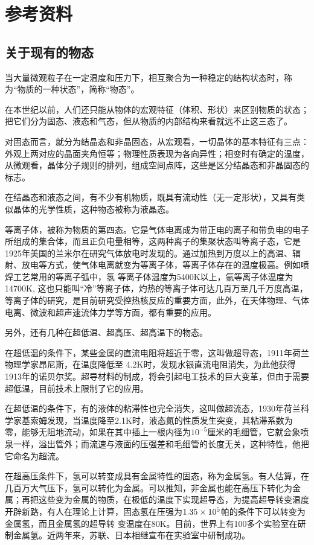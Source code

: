 \section{参考资料}
\subsection{关于现有的物态}

当大量微观粒子在一定温度和压力下，相互聚合为一种稳定的结构状态时，称为“物质的一种状态”，简称“物态”。

在本世纪以前，人们还只能从物体的宏观特征（体积、形状）来区别物质的状态；把它们分为固态、液态和气态，但从物质的内部结构来看就远不止这三态了。

对固态而言，就分为结晶态和非晶固态，从宏观看，一切晶体的基本特征有三点：外观上两对应的晶面夹角恒等；物理性质表现为各向异性；相变时有确定的温度，从微观看，晶体分子规则的排列，组成空间点阵，这些是区分结晶态和非晶固态的标志。

在结晶态和液态之间，有不少有机物质，既具有流动性（无一定形状），又具有类似晶体的光学性质，这种物态被称为液晶态。

等离子体，被称为物质的第四态。它是气体电离成为带正电的离子和带负电的电子所组成的集合体，而且正负电量相等，这两种离子的集聚状态叫等离子态，它是1925年美国的兰米尔在研究气体放电时发现的。通过加热到万度以上的高温、辐射、放电等方式，使气体电离就变为等离子体，等离子体存在的温度极高。例如喷焊工艺常用的等离子弧中，氢
等离子体温度为5400K以上，氩等离子体温度为14700K, 这也只能叫“冷”等离子体，灼热的等离子体可达几百万至几千万度高温，等离子体的研究，是目前研究受控热核反应的重要方面，此外，在天体物理、气体电离、微波和超声速流体力学等方面，都有重要的应用。

另外，还有几种在超低温、超高压、超高温下的物态。

在超低温的条件下，某些金属的直流电阻将超近于零，这叫做超导态，1911年荷兰物理学家昂尼斯，在温度降低至
4.2K时，发现水银直流电阻消失，为此他获得1913年的诺贝尔奖。超导材料的制成，将会引起电工技术的巨大变革，但由于需要超低温，目前技术上限制了它的应用。

在超低温的条件下，有的液体的粘滞性也完全消失，这叫做超流态，1930年荷兰科学家基索姆发现，当温度降至2.1K时，液态氮的性质发生突变，其粘滞系数为零，能够无阻地流动，如果在其中插上一根内径为$10^{-5}$厘米的毛细管，它就会象喷泉一样，溢出管外；而流速与液面的压强差和毛细管的长度无关，这种特性，他把它命名为超流。

在超高压条件下，氢可以转变成具有金属特性的固态，称为金属氢。有人估算，在几百万大气压下，氢可以转化为金属。可以推知，非金属也能在高压下转化为金属；再把这些变为金属的物质，在极低的温度下实现超导态，为提高超导转变温度开辟新路，有人在理论上计算，固态氢在压强为$1. 35\times10^5$帕的条件下可以转变为金属氢，而且金属氢的超导转
变温度在80K。目前，世界上有100多个实验室在研制金属氢。近两年来，苏联、日本相继宣布在实验室中研制成功。

